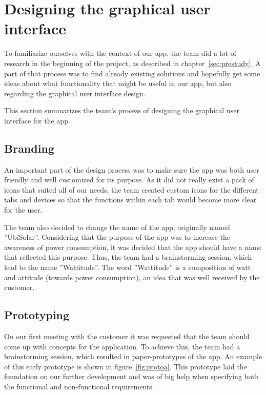 \section{Designing the graphical user interface}
To familiarize ourselves with the context of our app, the team did a lot of research in the beginning of the project, as described in chapter~\ref{sec:prestudy}. A part of that process was to find already existing solutions and hopefully get some ideas about what functionality that might be useful in our app, but also regarding the graphical user interface design.

This section summarizes the team's process of designing the graphical user interface for the app.

\subsection{Branding}
An important part of the design process was to make sure the app was both user friendly and well customized for its purpose. As it did not really exist a pack of icons that suited all of our needs, the team created custom icons for the different tabs and devices so that the functions within each tab would become more clear for the user.

The team also decided to change the name of the app, originally named ''UbiSolar''. Considering that the purpose of the app was to increase the awareness of power consumption, it was decided that the app should have a name that reflected this purpose. Thus, the team had a brainstorming session, which lead to the name ''Wattitude''. The word ''Wattitude'' is a composition of watt and attitude (towards power consumption), an idea that was well received by the customer.

\subsection{Prototyping}
On our first meeting with the customer it was requested that the team should come up with concepts for the application. To achieve this, the team had a brainstorming session, which resulted in paper-prototypes of the app. An example of this early prototype is shown in figure~\ref{fig:protoa}. This prototype laid the foundation on our further development and was of big help when specifying both the functional and non-functional requirements.

